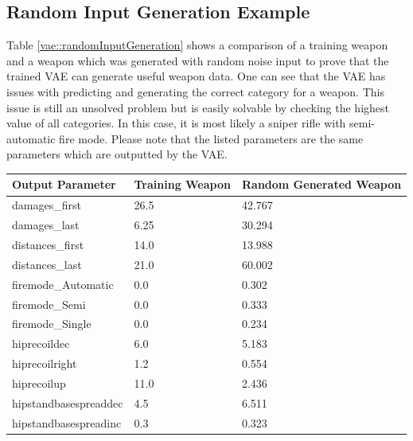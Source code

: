 \documentclass[MGS,Master,english]{twbook}%
\begin{document}
\subsection{Random Input Generation Example} \label{vae::randomInputExample}
Table \ref{vae::randomInputGeneration} shows a comparison of a training weapon and a weapon which was generated with random noise input to prove that the trained \ac{VAE} can generate useful weapon data. One can see that the \ac{VAE} has issues with predicting and generating the correct category for a weapon. This issue is still an unsolved problem but is easily solvable by checking the highest value of all categories. In this case, it is most likely a sniper rifle with semi-automatic fire mode. Please note that the listed parameters are the same parameters which are outputted by the \ac{VAE}.
\begin{table}[!ht]
	\centering
	\begin{tabular}{|l|p{3.6cm}|p{3.6cm}|}
		\hline
		\textbf{Output Parameter}       & \textbf{Training Weapon} & \textbf{Random Generated Weapon} \\ \hline\hline
		damages\_first           & 26.5                 & 42.767                    \\ \hline
		damages\_last            & 6.25                 & 30.294                    \\ \hline
		distances\_first    & 14.0                 & 13.988                    \\ \hline
		distances\_last     & 21.0                 & 60.002                    \\ \hline
		firemode\_Automatic      & 0.0                  & 0.302                     \\ \hline
		firemode\_Semi & 0.0                  & 0.333                     \\ \hline
		firemode\_Single & 0.0                  & 0.234                     \\ \hline
		hiprecoildec             & 6.0                  & 5.183                     \\ \hline
		hiprecoilright           & 1.2                  & 0.554                     \\ \hline
		hiprecoilup              & 11.0                 & 2.436                     \\ \hline
		hipstandbasespreaddec    & 4.5                  & 6.511                     \\ \hline
		hipstandbasespreadinc    & 0.3                  & 0.323                     \\ \hline

\end{tabular}
\end{table}
\end{document}

